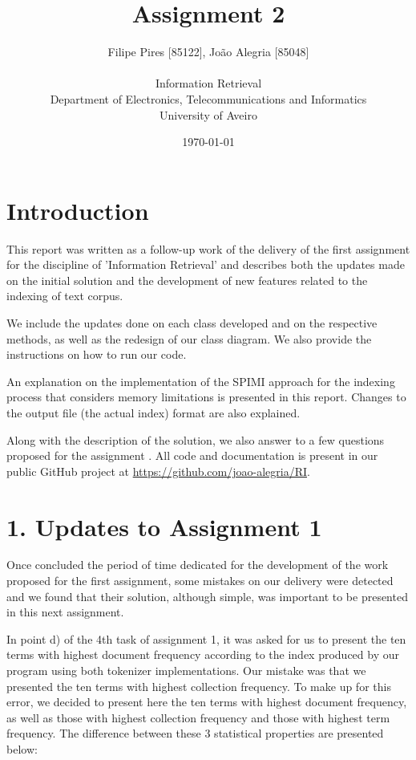 \documentclass[12pt]{article}
\title{Assignment 2}
\author
{Filipe Pires [85122], João Alegria [85048]\\
\\
Information Retrieval\\
\normalsize{Department of Electronics, Telecommunications and Informatics}\\
\normalsize{University of Aveiro}\\
}
\date{\today{}}
\begin{document}
 
\baselineskip18pt
\maketitle 

\section*{Introduction}

This report was written as a follow-up work of the delivery of the first 
assignment for the discipline of 'Information Retrieval' and describes both
the updates made on the initial solution and the development of new features 
related to the indexing of text corpus.

We include the updates done on each class developed and on the respective
methods, as well as the redesign of our class diagram.
We also provide the instructions on how to run our code.

An explanation on the implementation of the SPIMI approach for the indexing
process that considers memory limitations is presented in this report.
Changes to the output file (the actual index) format are also explained.

Along with the description of the solution, we also answer to a few questions
proposed for the assignment \cite{assign2}.
All code and documentation is present in our public GitHub project at 
\url{https://github.com/joao-alegria/RI}. 

\newpage
\section*{1. Updates to Assignment 1}

Once concluded the period of time dedicated for the development of the work 
proposed for the first assignment, some mistakes on our delivery were
detected and we found that their solution, although simple, was important to
be presented in this next assignment.

In point d) of the 4th task of assignment 1, it was asked for us to present
the ten terms with highest document frequency according to the index produced
by our program using both tokenizer implementations.
Our mistake was that we presented the ten terms with highest collection 
frequency. To make up for this error, we decided to present here the ten terms
with highest document frequency, as well as those with highest collection 
frequency and those with highest term frequency.
The difference between these 3 statistical properties are presented below:
\end{document}
